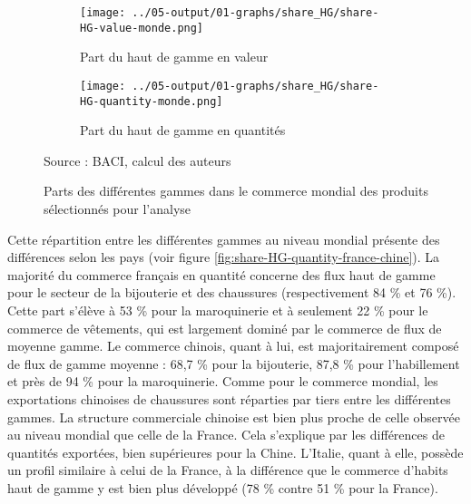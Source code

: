 \documentclass[french,10pt,a4paper]{article}
\begin{document}
\begin{figure}[!h]
  \centering
  \begin{subfigure}{\textwidth}
    \centering    
    \texttt{[image: ../05-output/01-graphs/share\_HG/share-HG-value-monde.png]}
    \caption{Part du haut de gamme en valeur}
    \label{fig:share-HG-value-monde}
  \end{subfigure}
  \vspace{0.5cm}
  \begin{subfigure}{\textwidth}
    \centering
 \texttt{[image: ../05-output/01-graphs/share\_HG/share-HG-quantity-monde.png]}
 \caption{Part du haut de gamme en quantités}
 \label{fig:share-HG-quantity-monde}
\end{subfigure}
\captionsetup{justification=raggedright,singlelinecheck=false, font=small}
  \caption*{Source : BACI, calcul des auteurs}
  \captionsetup{justification=centering, singlelinecheck=true, font=normalsize}
  \caption{Parts des différentes gammes dans le commerce mondial des produits sélectionnés pour l'analyse}
  \label{fig:share-HG-value-quantity-monde}
\end{figure}

\bigskip

Cette répartition entre les différentes gammes au niveau mondial présente des différences selon les pays (voir figure \ref{fig:share-HG-quantity-france-chine}). La majorité du commerce français en quantité concerne des flux haut de gamme pour le secteur de la bijouterie et des chaussures (respectivement 84 \% et 76 \%). Cette part s'élève à 53 \% pour la maroquinerie et à seulement 22 \% pour le commerce de vêtements, qui est largement dominé par le commerce de flux de moyenne gamme. Le commerce chinois, quant à lui, est majoritairement composé de flux de gamme moyenne : 68,7 \% pour la bijouterie, 87,8 \% pour l'habillement et près de 94 \% pour la maroquinerie. Comme pour le commerce mondial, les exportations chinoises de chaussures sont réparties par tiers entre les différentes gammes. La structure commerciale chinoise est bien plus proche de celle observée au niveau mondial que celle de la France. Cela s'explique par les différences de quantités exportées, bien supérieures pour la Chine. L'Italie, quant à elle, possède un profil similaire à celui de la France, à la différence que le commerce d'habits haut de gamme y est bien plus développé (78 \% contre 51 \% pour la France).
\end{document}
